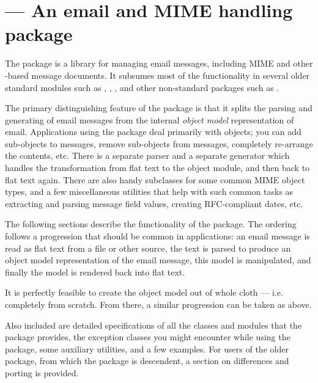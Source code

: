 
\section{ ---
	 An email and MIME handling package}



The  package is a library for managing email messages,
including MIME and other -based message documents.  It
subsumes most of the functionality in several older standard modules
such as , ,
, and other non-standard packages such as
.

The primary distinguishing feature of the  package is
that it splits the parsing and generating of email messages from the
internal \emph{object model} representation of email.  Applications
using the  package deal primarily with objects; you can
add sub-objects to messages, remove sub-objects from messages,
completely re-arrange the contents, etc.  There is a separate parser
and a separate generator which handles the transformation from flat
text to the object module, and then back to flat text again.  There
are also handy subclasses for some common MIME object types, and a few
miscellaneous utilities that help with such common tasks as extracting
and parsing message field values, creating RFC-compliant dates, etc.

The following sections describe the functionality of the
 package.  The ordering follows a progression that
should be common in applications: an email message is read as flat
text from a file or other source, the text is parsed to produce an
object model representation of the email message, this model is
manipulated, and finally the model is rendered back into
flat text.

It is perfectly feasible to create the object model out of whole cloth
--- i.e. completely from scratch.  From there, a similar progression
can be taken as above.  

Also included are detailed specifications of all the classes and
modules that the  package provides, the exception
classes you might encounter while using the  package,
some auxiliary utilities, and a few examples.  For users of the older
 package, from which the  package is
descendent, a section on differences and porting is provided.

